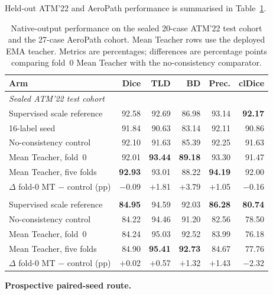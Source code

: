 \ifshowcurrentcontrol
\begin{currentcontrolroute}
Held-out ATM'22 and AeroPath performance is summarised in
Table~\ref{tab:external-evaluation}.

\begin{table}[htbp]
  \centering
  \footnotesize
  \setlength{\tabcolsep}{5pt}
  \caption[External evaluation]{Native-output performance on the sealed 20-case ATM'22 test
  cohort and the 27-case AeroPath cohort. Mean Teacher rows use the deployed EMA teacher.
  Metrics are percentages; differences are percentage points comparing fold~0 Mean Teacher
  with the no-consistency comparator.}
  \label{tab:external-evaluation}
  \begin{tabular}{lrrrrr}
    \toprule
    Arm & Dice & TLD & BD & Prec. & clDice \\
    \midrule
    \multicolumn{6}{l}{\itshape Sealed ATM'22 test cohort} \\
    Supervised scale reference & 92.58 & 92.69 & 86.98 & 93.14 & \textbf{92.17} \\
    16-label seed              & 91.84 & 90.63 & 83.14 & 92.11 & 90.86 \\
    No-consistency control     & 92.10 & 91.63 & 85.39 & 92.25 & 91.63 \\
    Mean Teacher, fold~0       & 92.01 & \textbf{93.44} & \textbf{89.18} & 93.30 & 91.47 \\
    Mean Teacher, five folds   & \textbf{92.93} & 93.01 & 88.22 & \textbf{94.19} & 92.00 \\
    $\Delta$ fold-0 MT $-$ control (pp) & $-$0.09 & $+$1.81 & $+$3.79 & $+$1.05 & $-$0.16 \\
    \addlinespace
    \multicolumn{6}{l}{\itshape AeroPath out-of-distribution cohort} \\
    Supervised scale reference & \textbf{84.95} & 94.59 & 92.03 & \textbf{86.28} & \textbf{80.74} \\
    No-consistency control     & 84.22 & 94.46 & 91.20 & 82.56 & 78.50 \\
    Mean Teacher, fold~0       & 84.24 & 95.03 & 92.52 & 83.99 & 76.18 \\
    Mean Teacher, five folds   & 84.90 & \textbf{95.41} & \textbf{92.73} & 84.67 & 77.76 \\
    \addlinespace
    $\Delta$ fold-0 MT $-$ control (pp) & $+$0.02 & $+$0.57 & $+$1.32 & $+$1.43 & $-$2.32 \\
    \bottomrule
  \end{tabular}
\end{table}
\end{currentcontrolroute}
\fi

\ifshowpairedcontrol
\begin{pairedcontrolroute}
\noindent\textbf{Prospective paired-seed route.}
\end{pairedcontrolroute}
\fi
